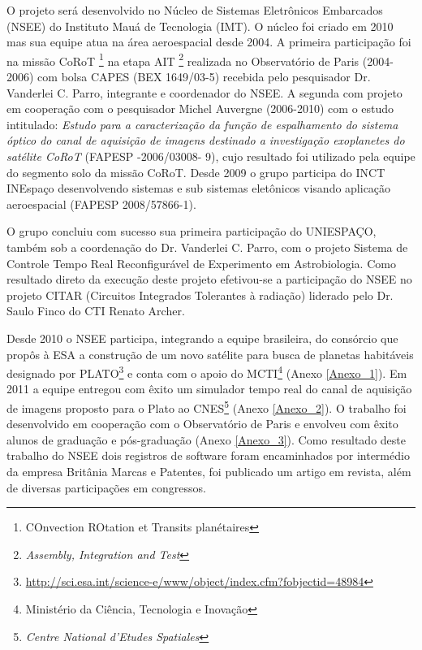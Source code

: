 O projeto será desenvolvido no Núcleo de Sistemas Eletrônicos Embarcados (NSEE) do Instituto Mauá de Tecnologia (IMT). O núcleo foi criado em 2010 mas sua equipe atua  na área aeroespacial desde 2004. A primeira participação foi na missão CoRoT \footnote{COnvection ROtation et Transits planétaires} na etapa AIT \footnote{\textit{Assembly, Integration and Test}} realizada no Observatório de Paris (2004-2006) com bolsa CAPES (BEX 1649/03-5) recebida pelo pesquisador Dr. Vanderlei C. Parro, integrante e coordenador do NSEE. A segunda com projeto em cooperação com o pesquisador Michel Auvergne (2006-2010) com o estudo intitulado:  \textit{Estudo para a caracterização da função de espalhamento do sistema óptico do canal de aquisição de imagens destinado a investigação exoplanetes do satélite CoRoT} (FAPESP -2006/03008- 9), cujo resultado foi utilizado pela equipe do segmento solo da missão CoRoT. Desde 2009 o grupo participa do INCT INEspaço desenvolvendo sistemas e sub sistemas eletônicos visando aplicação aeroespacial (FAPESP 2008/57866-1).


O grupo concluiu com sucesso sua primeira participação do UNIESPAÇO, também sob  a coordenação do Dr. Vanderlei C. Parro, com o projeto Sistema de Controle Tempo Real Reconfigurável de Experimento em Astrobiologia. Como resultado direto da execução deste projeto efetivou-se a participação do NSEE no projeto CITAR (Circuitos Integrados Tolerantes à radiação) liderado pelo Dr. Saulo Finco do CTI Renato Archer.

Desde 2010 o NSEE participa, integrando a equipe brasileira, do consórcio que propôs à ESA a construção de um novo satélite para  busca de planetas habitáveis designado por PLATO\footnote{\url{http://sci.esa.int/science-e/www/object/index.cfm?fobjectid=48984}} e conta com o apoio do MCTI\footnote{Ministério da Ciência, Tecnologia e Inovação} (Anexo \ref{Anexo_1}). Em 2011 a equipe entregou com êxito um simulador tempo real do canal de aquisição de imagens proposto para o Plato ao CNES\footnote{\textit{Centre National d'Etudes Spatiales}} (Anexo \ref{Anexo_2}). O trabalho foi desenvolvido em cooperação com o Observatório de Paris e envolveu com êxito alunos de graduação e pós-graduação (Anexo \ref{Anexo_3}). Como resultado deste trabalho do NSEE dois registros de software foram encaminhados por intermédio da empresa Britânia Marcas e Patentes, foi publicado um artigo em revista, além de diversas participações em congressos. 


